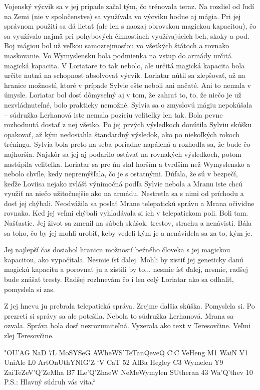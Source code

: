 \documentclass{book}
\begin{document}
Vojenský výcvik sa v jej prípade začal tým, čo trénovala teraz. Na rozdiel od ľudí na Zemi (nie v spoločenstve) sa využívala vo výcviku hodne aj mágia. Pri jej správnom použití sa dá lietať (ale len s naozaj obrovskou magickou kapacitou), čo sa využívalo najmä pri pohybových činnostiach využívajúcich beh, skoky a pod. Boj mágiou bol už veľkou samozrejmosťou vo všetkých štátoch a rovnako maskovanie. Vo Wymyslensku bola podmienka na vstup do armády určitá magická kapacita. V Loriatare to tak nebolo, ale určitá magická kapacita bola určite nutná na schopnosť absolvovať výcvik. Loriatar nútil sa zlepšovať, až na hranice možností, ktoré v prípade Sylvie ešte neboli ani načaté. Ani to nemala v úmysle. Loriatar bol dosť dômyselný aj v tom, že zahrať to, to, že niečo je už nezvládnuteľné, bolo prakticky nemožné. Sylvia sa o zmyslovú mágiu nepokúšala – súdružka Lerhanová iste nemala pozíciu veliteľky len tak. Bola pevne rozhodnutá dostať z nej všetko. Po jej prvých výsledkoch donútila Sylviu skúšku opakovať, až kým nedosiahla štandardný výsledok, ako po niekoľkých rokoch tréningu. Sylvia bola preto na seba poriadne napálená a rozhodla sa, že bude čo najhoršia. Najskôr sa jej aj podarilo ostávať na rovnakých výsledkoch, potom nastúpila veliteľka. Loriatar sa pre ňu stal horším a tvrdším než Wymyslensko a nebolo chvíle, kedy nepremýšľala, čo je s ostatnými. Dúfala, že sú v bezpečí, keďže Loviisa nejako zvlášť výnimočná podľa Sylvie nebola a Mranu iste chcú využiť na niečo užitočnejšie ako na armádu. Nestretla sa s nimi od príchodu a dosť jej chýbali. Neodvážila sa poslať Mrane telepatickú správu a Mrana očividne rovnako. Keď jej veľmi chýbali vyhľadávala si ich v telepatickom poli. Boli tam. Našťastie. Jej život sa zmenil na súbeh skúšok, trestov, strachu a nenávisti. Bála sa toho, čo by jej mohli urobiť, keby vedeli kým je a nenávidela sa za to, kým je.

Jej najlepší čas dosiahol hranicu možností bežného človeka s jej magickou kapacitou, ako vypočítala. Nesmie ísť ďalej. Mohli by zistiť jej geneticky danú magickú kapacitu a porovnať ju a zistili by to... nesmie ísť ďalej, nesmie, radšej bude znášať tresty. Radšej rozhnevám čo i len celý Loriatar ako sa odhaliť, pomyslela si zas.

Z jej hnevu ju prebrala telepatická správa. Zrejme ďalšia skúška. Pomyslela si. Po prezretí si správy sa ale potešila. Nebola to súdružka Lerhanová. Mrana sa ozvala. Správa bola dosť nezrozumiteľná. Vyzerala ako text v Teresovčine. Veľmi zlej Teresovčine.

"$ $OU'AG NaD 7L MoSYSeG AWheWS'TeTanQeveQ C‘C VeHeng M1 WaiN V1 UniAle L0 ArtOnUthYNIG'Z ‘V CaT 52 AlBa Hegley C3 Wymelen Y9 ZaiTeZeV'Q'ZeMha B7 ILe'Q'ZhaeW NeMeWymylen SUtheran 43 Wa'Q'thev 10 P.S.: Hlavný súdruh vás víta.“
\end{document}
